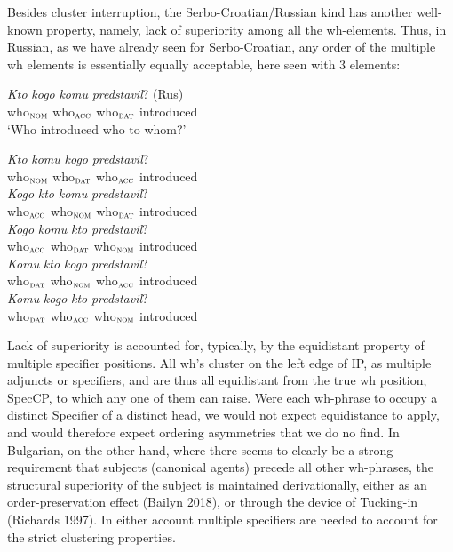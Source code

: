\documentclass[output=paper,colorlinks,citecolor=brown,
]{langscibook}
\begin{document}
Besides cluster interruption, the Serbo-Croatian/Russian kind has another well-known property, namely, lack of superiority among all the wh-elements. Thus, in Russian, as we have already seen for Serbo-Croatian, any order of the multiple wh elements is essentially equally acceptable, here seen with 3 elements:

\begin{exe}
\ex \label{bai11}

\begin{xlist}
\ex \label{bai11a}
\gll \emph{Kto}		\emph{kogo}		\emph{komu}		\emph{predstavil}? \hspace{4.5cm}(Rus) \\
who$_{\textsc{nom}}$ who$_{\textsc{acc}}$ who$_{\textsc{dat}}$ introduced \\
\glt `Who introduced who to whom?'

\ex \label{bai11b}
\gll \emph{Kto}			\emph{komu}	\emph{kogo}		\emph{predstavil}? \\
who$_{\textsc{nom}}$  who$_{\textsc{dat}}$ who$_{\textsc{acc}}$ introduced \\

\ex \label{bai11c}
\gll \emph{Kogo}	\emph{kto}			\emph{komu}		\emph{predstavil}? \\
who$_{\textsc{acc}}$ who$_{\textsc{nom}}$  who$_{\textsc{dat}}$  introduced \\

\ex \label{bai11d}
\gll \emph{Kogo}		\emph{komu}		\emph{kto}		\emph{predstavil}? \\
who$_{\textsc{acc}}$ who$_{\textsc{dat}}$  who$_{\textsc{nom}}$  introduced \\

\ex \label{bai11e}
\gll \emph{Komu}	\emph{kto}		\emph{kogo}		\emph{predstavil}? \\
who$_{\textsc{dat}}$  who$_{\textsc{nom}}$ who$_{\textsc{acc}}$  introduced \\

\ex \label{bai11f}
\gll \emph{Komu}	\emph{kogo}	\emph{kto}		\emph{predstavil}? \\
who$_{\textsc{dat}}$  who$_{\textsc{acc}}$   who$_{\textsc{nom}}$ introduced \\

\end{xlist}
\end{exe}

Lack of superiority is accounted for, typically, by the equidistant property of multiple specifier positions. All wh’s cluster on the left edge of IP, as multiple adjuncts or specifiers, and are thus all equidistant from the true wh position, SpecCP, to which any one of them can raise. Were each wh-phrase to occupy a distinct Specifier of a distinct head, we would not expect equidistance to apply, and would therefore expect ordering asymmetries that we do no find. In Bulgarian, on the other hand, where there seems to clearly be a strong requirement that subjects (canonical agents) precede all other wh-phrases, the structural superiority of the subject is maintained derivationally, either as an order-preservation effect (Bailyn 2018), or through the device of Tucking-in (Richards 1997).  In either account multiple specifiers are needed to account for the strict clustering properties. 
\end{document}
